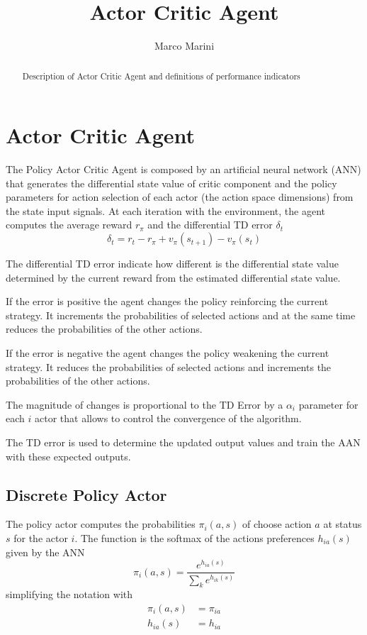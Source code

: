 \documentclass[]{article}
\title{Actor Critic Agent}
\author{Marco Marini}
\begin{document}
\maketitle

\begin{abstract}
Description of Actor Critic Agent and definitions of performance indicators
\end{abstract}

\tableofcontents

\section{Actor Critic Agent}

The Policy Actor Critic Agent is composed by an artificial neural network (ANN) that generates the differential state value of critic component and the policy parameters for action selection of each actor (the action space dimensions) from the state input signals.
At each iteration with the environment, the agent computes the average reward $r_\pi$ and the differential TD error $ \delta_t $
\begin{equation}
\delta_t = r_t - r_\pi + v_\pi(s_{t+1}) - v_\pi(s_t)	
\end{equation}

The differential TD error indicate how different is the differential state value determined by the current reward from the estimated differential state value.

If the error is positive the agent changes the policy reinforcing the current strategy. It increments the probabilities of selected actions and at the same time reduces the probabilities of the other actions.

If the error is negative the agent changes the policy weakening the current strategy. It reduces the probabilities of selected actions and increments the probabilities of the other actions.

The magnitude of changes is proportional to the TD Error by a $ \alpha_i $ parameter for each $ i $ actor that allows to control the convergence of the algorithm.

The TD error is used to determine the updated output values and train the AAN with these expected outputs.

\subsection{Discrete Policy Actor}

The policy actor computes the probabilities $ \pi_i(a, s) $ of choose action $ a $ at status $ s $ for the actor $ i $.
The function is the softmax of the actions preferences $ h_{ia}(s) $ given by the ANN 
\begin{equation}
	\pi_i(a, s) = \frac{e^{h_{ia}(s)}}{\sum_k e^{h_{ik}(s)}}
\end{equation}
simplifying the notation with
\begin{align*}
	\pi_i(a, s) & = \pi_{ia}
	\\
	h_{ia}(s) & = h_{ia}
\end{align*}
\end{document}
